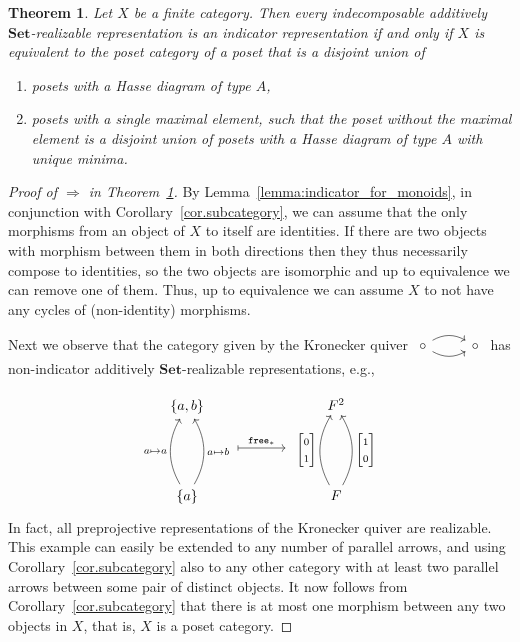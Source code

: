 \documentclass[10pt,a4paper]{amsart}
\newtheorem{theorem}{Theorem}
\newcommand{\Set}{\mathbf{Set}}
\newcommand{\funct}[1]{\operatorname{\mathtt{#1}}}
\begin{document}
\begin{theorem}
\label{thm.onlythin}
Let \( X \) be a finite category. Then every indecomposable additively \( \Set \)-realizable representation is an indicator representation if and only if \( X \) is equivalent to the poset category of a poset that is a disjoint union of
\begin{enumerate}
\item posets with a Hasse diagram of type \( A \),
\item posets with a single maximal element, such that the poset without the maximal element is a disjoint union of posets with a Hasse diagram of type \( A \) with unique minima.
\end{enumerate}
\end{theorem}

\begin{proof}[Proof of \( \Rightarrow \) in Theorem~\ref{thm.onlythin}]
By Lemma~\ref{lemma:indicator_for_monoids}, in conjunction with Corollary~\ref{cor.subcategory},  we can assume that the only morphisms from an object of \( X \) to itself are identities. If there are two objects with morphism between them in both directions then they thus necessarily compose to identities, so the two objects are isomorphic and up to equivalence we can remove one of them. Thus, up to equivalence we can assume \( X \) to not have any cycles of (non-identity) morphisms.

Next we observe that the category given by the Kronecker quiver $\begin{tikzcd} \circ\ar[r, bend left]\ar[r, bend right] & \circ \end{tikzcd}$ has non-indicator additively \( \Set \)-realizable representations, e.g.,

\[
\begin{tikzcd}[sep=7mm,ampersand replacement=\&]
  \{a,b\} \& \& \& \& F^2 \\
 ~\ar[rrrr,mapsto, shorten <= 30pt, shorten >= 30pt, "\funct{free}_*"] \& \&  \& \& ~\\
  \{a\} \arrow[uu,swap, bend right, "a\mapsto b"]\arrow[uu,"a\mapsto a", bend left]  \& \& \&  \& F\arrow[uu, "{\begin{bmatrix}0 \\ 1\end{bmatrix}}", bend left] \arrow[uu, swap, "{\begin{bmatrix}1 \\ 0\end{bmatrix}}", bend right]
\end{tikzcd}
\]
In fact, all preprojective representations of the Kronecker quiver are realizable.
This example can easily be extended to any number of parallel arrows, and using Corollary~\ref{cor.subcategory} also to any other category with at least two parallel arrows between some pair of distinct objects.
It now follows from Corollary~\ref{cor.subcategory} that there is at most one morphism between any two objects in \( X \), that is, \( X \) is a poset category.


\end{proof}
\end{document}
